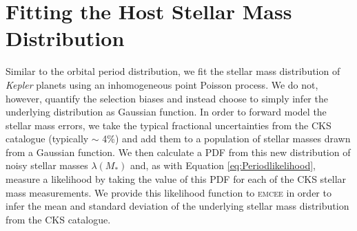 \documentclass[fleqn,usenatbib]{mnras}
\begin{document}
\section{Fitting the Host Stellar Mass Distribution} \label{sec:SmassAppendix}
Similar to the orbital period distribution, we fit the stellar mass distribution of \textit{Kepler} planets using an inhomogeneous point Poisson process. We do not, however, quantify the selection biases and instead choose to simply infer the underlying distribution as Gaussian function. In order to forward model the stellar mass errors, we take the typical fractional uncertainties from the CKS catalogue (typically $\sim$ 4\%) and add them to a population of stellar masses drawn from a Gaussian function. We then calculate a PDF from this new distribution of noisy stellar masses $\lambda(M_*)$ and, as with Equation \ref{eq:Periodlikelihood}, measure a likelihood by taking  the value of this PDF for each of the CKS stellar mass measurements. We provide this likelihood function to \textsc{emcee} \citep{emcee} in order to infer the mean and standard deviation of the underlying stellar mass distribution from the CKS catalogue.
\label{sec:MstarFitting}














\appendix





\bsp	%
\label{lastpage}
\end{document}
